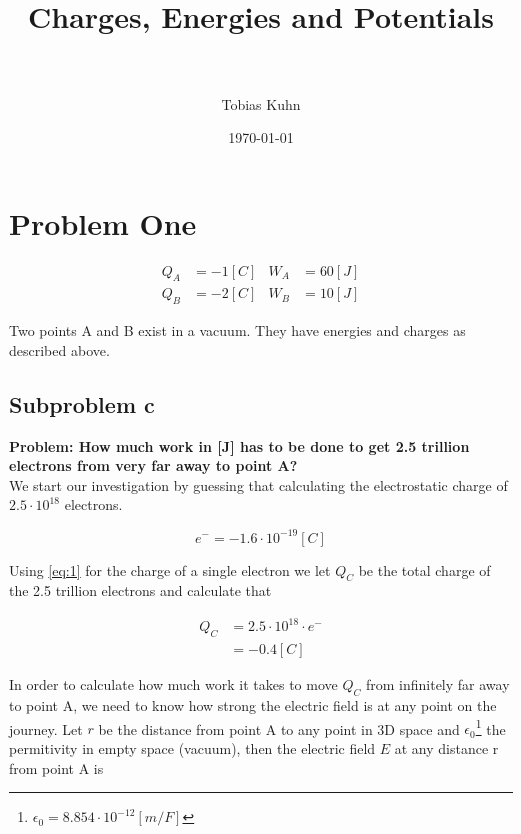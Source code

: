 \documentclass[paper=a4, fontsize=11pt]{scrartcl} %
\title{	
\normalfont \normalsize 
\horrule{0.5pt} \\[0.4cm] %
\huge Charges, Energies and Potentials \\ %
\horrule{2pt} \\[0.5cm] %
}
\author{Tobias Kuhn} %
\date{\normalsize\today} %
\numberwithin{equation}{section} %
\numberwithin{figure}{section} %
\numberwithin{table}{section} %
\begin{document}
\maketitle %


\section{Problem One}

\begin{align} 
Q_A &= -1[C] & W_A &= 60[J] \label{eq:A} \\
Q_B &= -2[C] & W_B &= 10[J] \label{eq:B}
\end{align}

Two points A and B exist in a vacuum. They have energies and charges as described above.

\subsection{Subproblem c}
\textbf{Problem: How much work in [J] has to be done to get 2.5 trillion electrons from very far away to point A?}
\\

We start our investigation by guessing that calculating the electrostatic charge of $2.5 \cdot 10^{18}$ electrons.

\begin{equation} \label{eq:1}
e^- = -1.6 \cdot 10^{-19} [C]
\end{equation}

Using \ref{eq:1} for the charge of a single electron we let $Q_C$ be the total charge of the 2.5 trillion electrons and calculate that

\begin{align} \label{eq:2}
Q_C &= 2.5 \cdot 10^{18} \cdot e^- \\ &= -0.4 [C]
\end{align}

In order to calculate how much work it takes to move $Q_C$ from infinitely far away to point A,
we need to know how strong the electric field is at any point on the journey. 
Let $r$ be the distance from point A to any point in 3D space and $\epsilon_0$\footnote{$\epsilon_0 = 8.854 \cdot 10 ^ {-12} [m/F] $} the permitivity in empty space (vacuum),
then the electric field $E$ at any distance r from point A is 
\end{document}
